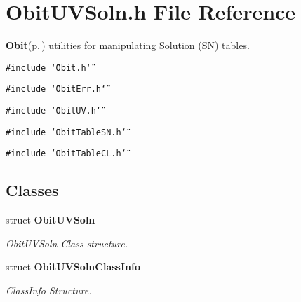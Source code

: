 \section{Obit\-UVSoln.h File Reference}
\label{ObitUVSoln_8h}
{\bf Obit}{\rm (p.\,\pageref{structObit})} utilities for manipulating Solution (SN) tables. 

{\tt \#include \char`\"{}Obit.h\char`\"{}}\par
{\tt \#include \char`\"{}Obit\-Err.h\char`\"{}}\par
{\tt \#include \char`\"{}Obit\-UV.h\char`\"{}}\par
{\tt \#include \char`\"{}Obit\-Table\-SN.h\char`\"{}}\par
{\tt \#include \char`\"{}Obit\-Table\-CL.h\char`\"{}}\par
\subsection*{Classes}
\begin{CompactItemize}
\item 
struct {\bf Obit\-UVSoln}
\begin{CompactList}\small\item\em Obit\-UVSoln Class structure. \item\end{CompactList}\item 
struct {\bf Obit\-UVSoln\-Class\-Info}
\begin{CompactList}\small\item\em Class\-Info Structure. \item\end{CompactList}\end{CompactItemize}
